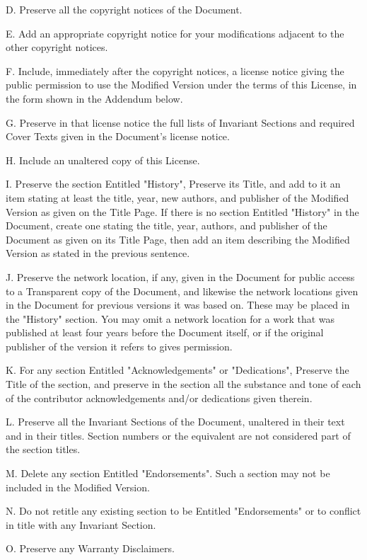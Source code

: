 D. Preserve all the copyright notices of the Document. 

E. Add an appropriate copyright notice for your modifications adjacent to the other copyright notices. 

F. Include, immediately after the copyright notices, a license notice giving the public permission to use the Modified Version under the terms of this License, in the form shown in the Addendum below. 

G. Preserve in that license notice the full lists of Invariant Sections and required Cover Texts given in the Document's license notice. 

H. Include an unaltered copy of this License. 

I. Preserve the section Entitled "History", Preserve its Title, and add to it an item stating at least the title, year, new authors, and publisher of the Modified Version as given on the Title Page. If there is no section Entitled "History" in the Document, create one stating the title, year, authors, and publisher of the Document as given on its Title Page, then add an item describing the Modified Version as stated in the previous sentence. 

J. Preserve the network location, if any, given in the Document for public access to a Transparent copy of the Document, and likewise the network locations given in the Document for previous versions it was based on. These may be placed in the "History" section. You may omit a network location for a work that was published at least four years before the Document itself, or if the original publisher of the version it refers to gives permission. 

K. For any section Entitled "Acknowledgements" or "Dedications", Preserve the Title of the section, and preserve in the section all the substance and tone of each of the contributor acknowledgements and/or dedications given therein. 

L. Preserve all the Invariant Sections of the Document, unaltered in their text and in their titles. Section numbers or the equivalent are not considered part of the section titles. 

M. Delete any section Entitled "Endorsements". Such a section may not be included in the Modified Version. 

N. Do not retitle any existing section to be Entitled "Endorsements" or to conflict in title with any Invariant Section. 

O. Preserve any Warranty Disclaimers. 

